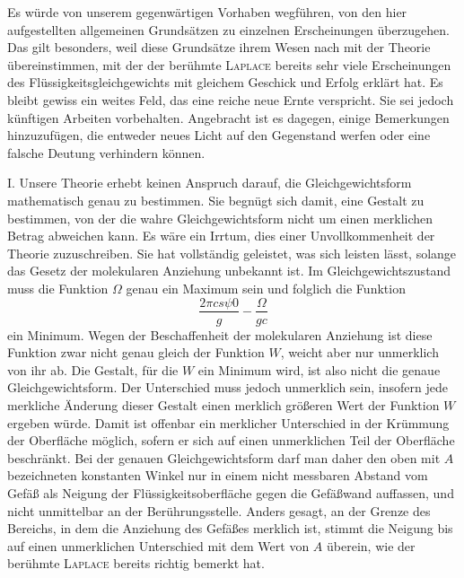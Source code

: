 Es würde von unserem gegenwärtigen Vorhaben wegführen, von den hier aufgestellten allgemeinen Grundsätzen zu einzelnen Erscheinungen überzugehen. Das gilt besonders, weil diese Grundsätze ihrem Wesen nach mit der Theorie übereinstimmen, mit der der berühmte \textsc{Laplace} bereits sehr viele Erscheinungen des Flüssigkeitsgleichgewichts mit gleichem Geschick und Erfolg erklärt hat. Es bleibt gewiss ein weites Feld, das eine reiche neue Ernte verspricht. Sie sei jedoch künftigen Arbeiten vorbehalten. Angebracht ist es dagegen, einige Bemerkungen hinzuzufügen, die entweder neues Licht auf den Gegenstand werfen oder eine falsche Deutung verhindern können.

I. Unsere Theorie erhebt keinen Anspruch darauf, die Gleichgewichtsform mathematisch genau zu bestimmen. Sie begnügt sich damit, eine Gestalt zu bestimmen, von der die wahre Gleichgewichtsform nicht um einen merklichen Betrag abweichen kann. Es wäre ein Irrtum, dies einer Unvollkommenheit der Theorie zuzuschreiben. Sie hat vollständig geleistet, was sich leisten lässt, solange das Gesetz der molekularen Anziehung unbekannt ist. Im Gleichgewichtszustand muss die Funktion $\Omega$ genau ein Maximum sein und folglich die Funktion
\[
\frac{2\pi cs\psi0}g-\frac\Omega{gc}
\]
ein Minimum. Wegen der Beschaffenheit der molekularen Anziehung ist diese Funktion zwar nicht genau gleich der Funktion $W$, weicht aber nur unmerklich von ihr ab. Die Gestalt, für die $W$ ein Minimum wird, ist also nicht die genaue Gleichgewichtsform. Der Unterschied muss jedoch unmerklich sein, insofern jede merkliche Änderung dieser Gestalt einen merklich größeren Wert der Funktion $W$ ergeben würde. Damit ist offenbar ein merklicher Unterschied in der Krümmung der Oberfläche möglich, sofern er sich auf einen unmerklichen Teil der Oberfläche beschränkt. Bei der genauen Gleichgewichtsform darf man daher den oben mit $A$ bezeichneten konstanten Winkel nur in einem nicht messbaren Abstand vom Gefäß als Neigung der Flüssigkeitsoberfläche gegen die Gefäßwand auffassen, und nicht unmittelbar an der Berührungsstelle. Anders gesagt, an der Grenze des Bereichs, in dem die Anziehung des Gefäßes merklich ist, stimmt die Neigung bis auf einen unmerklichen Unterschied mit dem Wert von $A$ überein, wie der berühmte \textsc{Laplace} bereits richtig bemerkt hat.

